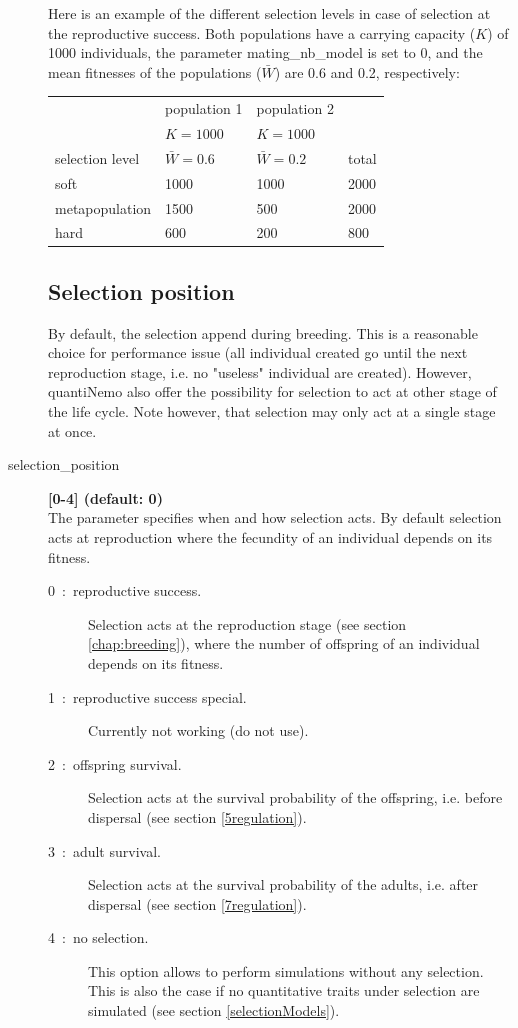 \documentclass[letterpaper,12pt,oneside]{book}
\begin{document}
\begin{description}
Here is an example of the different selection levels in case of selection at the reproductive success. Both populations have a carrying capacity ($K$) of 1000 individuals, the parameter \textsf{mating\_nb\_model} is set to 0, and the mean fitnesses of the populations ($\bar{W}$) are 0.6 and 0.2, respectively:\\
\begin{tabular*}{0.92\textwidth}{llll}
 \hline             & population 1    & population 2   & \\ 
                    & $K = 1000$      & $K = 1000$     & \\
 selection level&   $\bar{W} = 0.6$ & $\bar{W} = 0.2$& total\\
 \hline
 soft               & 1000            & 1000           & 2000\\
 metapopulation     & 1500            & 500            & 2000\\
 hard               & 600             & 200            & 800\\
 \hline
\end{tabular*}

\subsection{Selection position}
By default, the selection append during breeding. This is a reasonable choice for performance issue (all individual created go until the next reproduction stage, i.e. no "useless" individual are created). However, quantiNemo also offer the possibility for selection to act at other stage of the life cycle. Note however, that selection may only act at a single stage at once. 
\item[selection\_position\index{selection\_position}] \textbf{[0-4] (default: 0)}\\
The parameter specifies when and how selection acts. By default selection acts at reproduction where the fecundity of an individual depends on its fitness.
\begin{description}
\item [0~:~reproductive success.] Selection acts at the reproduction stage (see section \ref{chap:breeding}), where the number of offspring of an individual depends on its fitness.
\item [1~:~reproductive success special.] Currently not working (do not use). 
\item [2~:~offspring survival.] Selection acts at the survival probability of the offspring, i.e. before dispersal (see section \ref{5regulation}).
\item [3~:~adult survival.] Selection acts at the survival probability of the adults, i.e. after dispersal (see section \ref{7regulation}).
\item [4~:~no selection.] This option allows to perform simulations without any selection. This is also the case if no quantitative traits under selection are simulated (see section \ref{selectionModels}).
\end{description}


\end{description}
\end{document}
